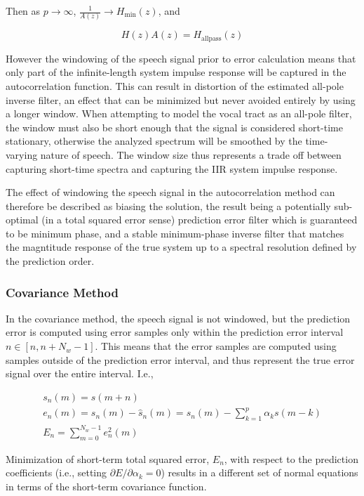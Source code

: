 \noindent
Then as $p \rightarrow \infty$, $\frac{1}{A(z)} \rightarrow H_{\mathrm{min}}(z)$, and

\begin{equation}
	H(z) A(z) = H_{\mathrm{allpass}}(z) 
\end{equation}

However the windowing of the speech signal prior to error calculation means that only part of the infinite-length system impulse response will be captured in the autocorrelation function. This can result in distortion of the estimated all-pole inverse filter, an effect that can be minimized but never avoided entirely by using a longer window. When attempting to model the vocal tract as an all-pole filter, the window must also be short enough that the signal is considered short-time stationary, otherwise the analyzed spectrum will be smoothed by the time-varying nature of speech. The window size thus represents a trade off between capturing short-time spectra and capturing the IIR system impulse response. 

The effect of windowing the speech signal in the autocorrelation method can therefore be described as biasing the solution, the result being a potentially sub-optimal (in a total squared error sense) prediction error filter which is guaranteed to be minimum phase, and a stable minimum-phase inverse filter that matches the magntitude response of the true system up to a spectral resolution defined by the prediction order.


\subsubsection{Covariance Method}

In the covariance method, the speech signal is not windowed, but the prediction error is computed using error samples only within the prediction error interval $n \in [n, n+N_w-1]$. This means that the error samples are computed using samples outside of the prediction error interval, and thus represent the true error signal over the entire interval. I.e.,

\begin{eqnarray}
	s_n(m) = s(m+n) \\
	e_n(m) = s_n(m) - \hat{s}_n(m) = s_n(m) - \sum_{k=1}^{p} \alpha_k s(m-k) \\
	E_n = \sum_{m=0}^{N_w-1} e_n^2(m) \label{eq:cov_tse}
\end{eqnarray}

 Minimization of short-term total squared error, $E_n$, with respect to the prediction coefficients (i.e., setting $\partial E/\partial \alpha_k=0$) results in a different set of normal equations in terms of the short-term covariance function. 
 
